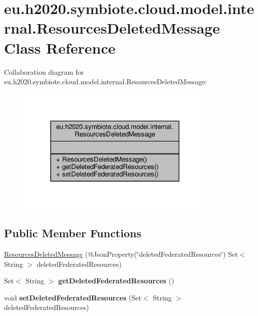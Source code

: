 \hypertarget{classeu_1_1h2020_1_1symbiote_1_1cloud_1_1model_1_1internal_1_1ResourcesDeletedMessage}{}\section{eu.\+h2020.\+symbiote.\+cloud.\+model.\+internal.\+Resources\+Deleted\+Message Class Reference}
\label{classeu_1_1h2020_1_1symbiote_1_1cloud_1_1model_1_1internal_1_1ResourcesDeletedMessage}


Collaboration diagram for eu.\+h2020.\+symbiote.\+cloud.\+model.\+internal.\+Resources\+Deleted\+Message\+:
\nopagebreak
\begin{figure}[H]
\begin{center}
\leavevmode
\includegraphics[width=272pt]{classeu_1_1h2020_1_1symbiote_1_1cloud_1_1model_1_1internal_1_1ResourcesDeletedMessage__coll__graph}
\end{center}
\end{figure}
\subsection*{Public Member Functions}
\begin{DoxyCompactItemize}
\item 
\hyperlink{classeu_1_1h2020_1_1symbiote_1_1cloud_1_1model_1_1internal_1_1ResourcesDeletedMessage_af4925b3c3a25515739730f07478a04b3}{Resources\+Deleted\+Message} (@Json\+Property(\char`\"{}deleted\+Federated\+Resources\char`\"{}) Set$<$ String $>$ deleted\+Federated\+Resources)
\item 
\mbox{\label{classeu_1_1h2020_1_1symbiote_1_1cloud_1_1model_1_1internal_1_1ResourcesDeletedMessage_a2121e99ecd401563595b6ee6d4608caa}} 
Set$<$ String $>$ {\bfseries get\+Deleted\+Federated\+Resources} ()
\item 
\mbox{\label{classeu_1_1h2020_1_1symbiote_1_1cloud_1_1model_1_1internal_1_1ResourcesDeletedMessage_a781ba352f2361e786b47151156905709}} 
void {\bfseries set\+Deleted\+Federated\+Resources} (Set$<$ String $>$ deleted\+Federated\+Resources)
\end{DoxyCompactItemize}


